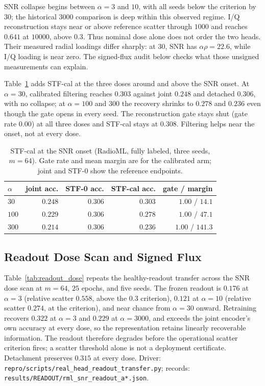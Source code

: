 \documentclass{article}
\begin{document}
SNR collapse begins between $\alpha=3$ and $10$, with all seeds below the criterion by $30$; the historical $3000$ comparison is deep within this observed regime. I/Q reconstruction stays near or above reference scatter through $1000$ and reaches $0.641$ at $10000$, above $0.3$. Thus nominal dose alone does not order the two heads. Their measured radial loadings differ sharply: at $30$, SNR has $\alpha\rho=22.6$, while I/Q loading is near zero. The signed-flux audit below checks what those unsigned measurements can explain.

Table~\ref{tab:rml_stf} adds STF-cal at the three doses around and above the SNR onset. At $\alpha=30$, calibrated filtering reaches $0.303$ against joint $0.248$ and detached $0.306$, with no collapse; at $\alpha=100$ and $300$ the recovery shrinks to $0.278$ and $0.236$ even though the gate opens in every seed. The reconstruction gate stays shut (gate rate $0.00$) at all three doses and STF-cal stays at $0.308$. Filtering helps near the onset, not at every dose.

\begin{table}[h]
\centering
\caption{STF-cal at the SNR onset (RadioML, fully labeled, three seeds, $m=64$). Gate rate and mean margin are for the calibrated arm; joint and STF-0 show the reference endpoints.}
\label{tab:rml_stf}
\footnotesize
\begin{tabular}{lrrrr}
\toprule
$\alpha$ & joint acc. & STF-0 acc. & STF-cal acc. & gate / margin \\
\midrule
$30$ & $0.248$ & $0.306$ & $0.303$ & $1.00$ / $14.1$ \\
$100$ & $0.229$ & $0.306$ & $0.278$ & $1.00$ / $47.1$ \\
$300$ & $0.214$ & $0.306$ & $0.236$ & $1.00$ / $141.3$ \\
\bottomrule
\end{tabular}
\end{table}

\subsection{Readout Dose Scan and Signed Flux}\label{app:real_flux}

Table~\ref{tab:readout_dose} repeats the healthy-readout transfer across the SNR dose scan at $m=64$, $25$ epochs, and five seeds. The frozen readout is $0.176$ at $\alpha=3$ (relative scatter $0.558$, above the $0.3$ criterion), $0.121$ at $\alpha=10$ (relative scatter $0.274$, at the criterion), and near chance from $\alpha=30$ onward. Retraining recovers $0.322$ at $\alpha=3$ and $0.229$ at $\alpha=3000$, and exceeds the joint encoder's own accuracy at every dose, so the representation retains linearly recoverable information. The readout therefore degrades before the operational scatter criterion fires; a scatter threshold alone is not a deployment certificate. Detachment preserves $0.315$ at every dose. Driver: \texttt{repro/scripts/real\_head\_readout\_transfer.py}; records: \texttt{results/READOUT/rml\_snr\_readout\_a*.json}.
\end{document}
